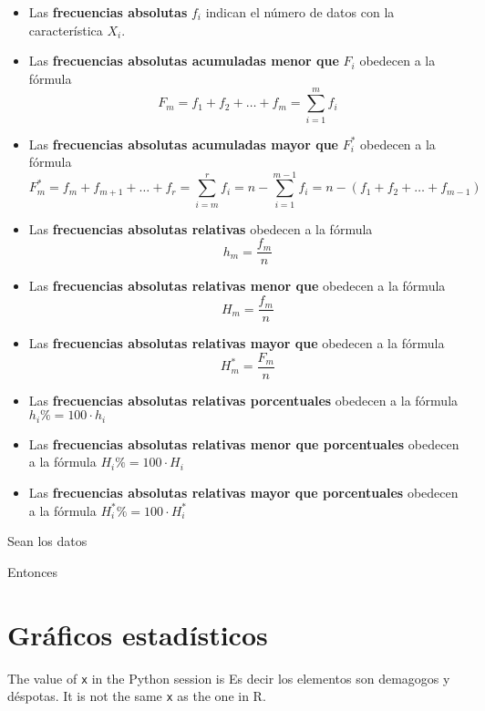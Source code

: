\documentclass[10pt,]{krantz}
\theoremstyle{definition}
\theoremstyle{definition}
\theoremstyle{definition}
\theoremstyle{remark}
\let\BeginKnitrBlock\begin \let\EndKnitrBlock\end
\begin{document}
\begin{itemize}
\item
  Las \textbf{frecuencias absolutas} \(f_i\) indican el número de datos con la característica \(X_i\).
\item
  Las \textbf{frecuencias absolutas acumuladas menor que} \(F_i\) obedecen a la fórmula
  \[F_m=f_1+f_2+\ldots+f_m=\sum_{i=1}^mf_i\]
\item
  Las \textbf{frecuencias absolutas acumuladas mayor que} \(F_i^*\) obedecen a la fórmula
  \[F_m^*=f_m+f_{m+1}+\ldots+f_r=\sum_{i=m}^rf_i=n-\sum_{i=1}^{m-1}f_i=n-\left(f_1+f_{2}+\ldots+f_{m-1}\right)\]
\item
  Las \textbf{frecuencias absolutas relativas} obedecen a la fórmula
  \[h_m=\frac{f_m}{n}\]
\item
  Las \textbf{frecuencias absolutas relativas menor que} obedecen a la fórmula
  \[H_m=\frac{f_m}{n}\]
\item
  Las \textbf{frecuencias absolutas relativas mayor que} obedecen a la fórmula
  \[H_m^*=\frac{F_m}{n}\]
\item
  Las \textbf{frecuencias absolutas relativas porcentuales} obedecen a la fórmula
  \(h_i\%=100\cdot h_i\)
\item
  Las \textbf{frecuencias absolutas relativas menor que porcentuales} obedecen a la fórmula
  \(H_i\%=100\cdot H_i\)
\item
  Las \textbf{frecuencias absolutas relativas mayor que porcentuales} obedecen a la fórmula
  \(H_i^*\%=100\cdot H_i^*\)
\end{itemize}

\BeginKnitrBlock{exercise}
\protect\hypertarget{exr:unnamed-chunk-3}{}{\label{exr:unnamed-chunk-3} }Sean los datos
\EndKnitrBlock{exercise}

\BeginKnitrBlock{solution}
\iffalse{} {Solución. } \fi{}Entonces
\EndKnitrBlock{solution}

\hypertarget{gruxe1ficos-estaduxedsticos}{%
\chapter{Gráficos estadísticos}\label{gruxe1ficos-estaduxedsticos}}

The value of \texttt{x} in the Python session is Es decir los elementos son demagogos y déspotas.
It is not the same \texttt{x} as the one in R.
\end{document}
